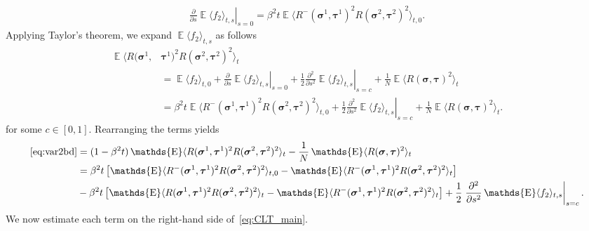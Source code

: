 \documentclass[letterpaper,11pt,reqno]{amsart}
\newcommand{\ra}{\rangle}
\newcommand{\la}{\langle}
\newcommand{\mvgs}{\boldsymbol{\sigma}}\newcommand{\mvgS}{\boldsymbol{\Sigma}}\newcommand{\mvgt}{\boldsymbol{\tau}}
\DeclareMathOperator{\E}{\mathds{E}}
\begin{document}
\begin{align*}
    \left. \frac{\partial}{\partial s} \E \la f_2 \ra_{t,s} \right|_{s=0} 
    = \beta^2 t \E \la R^-(\mvgs^1, \mvgt^1)^2 R(\mvgs^2, \mvgt^2)^2 \ra_{t,0}.
\end{align*}
Applying Taylor's theorem, we expand \(\E \la f_2 \ra_{t,s}\) as follows
\begin{align*}
    \E \la R(\mvgs^1, &\mvgt^1)^2 R(\mvgs^2, \mvgt^2)^2 \ra_{t}\\
    &= \E \la f_2 \ra_{t,0} + \left. \frac{\partial}{\partial s} \E \la f_2 \ra_{t,s} \right|_{s=0} + \frac{1}{2} \left. \frac{\partial^2}{\partial s^2} \E \la f_2 \ra_{t,s} \right|_{s=c} + \frac{1}{N} \E \la R(\mvgs, \mvgt)^2 \ra_{t} \\
    &= \beta^2 t \E \la R^-(\mvgs^1, \mvgt^1)^2 R(\mvgs^2, \mvgt^2)^2 \ra_{t,0}  + \frac{1}{2} \left. \frac{\partial^2}{\partial s^2} \E \la f_2 \ra_{t,s} \right|_{s=c} + \frac{1}{N} \E \la R(\mvgs, \mvgt)^2 \ra_{t}.
\end{align*}
for some \(c \in [0,1]\).
Rearranging the terms yields
\begin{align}
    \eqref{eq:var2bd}&=(1- \beta^2 t) \E \la R(\mvgs^1, \mvgt^1)^2 R(\mvgs^2, \mvgt^2)^2 \ra_{t} - \frac{1}{N} \E \la R(\mvgs, \mvgt)^2 \ra_{t} \nonumber \\
    &= \beta^2 t \left[ \E \la R^-(\mvgs^1, \mvgt^1)^2 R(\mvgs^2, \mvgt^2)^2 \ra_{t,0} - \E \la R^-(\mvgs^1, \mvgt^1)^2 R(\mvgs^2, \mvgt^2)^2 \ra_{t} \right] \label{eq:CLT_main}\\
    & - \beta^2 t \left[ \E \la R(\mvgs^1, \mvgt^1)^2 R(\mvgs^2, \mvgt^2)^2 \ra_{t} -\E \la R^-(\mvgs^1, \mvgt^1)^2 R(\mvgs^2, \mvgt^2)^2 \ra_{t} \right]  + \frac{1}{2} \left. \frac{\partial^2}{\partial s^2} \E \la f_2 \ra_{t,s} \right|_{s=c}.\notag
\end{align}
We now estimate each term on the right-hand side of~\eqref{eq:CLT_main}.
\end{document}

